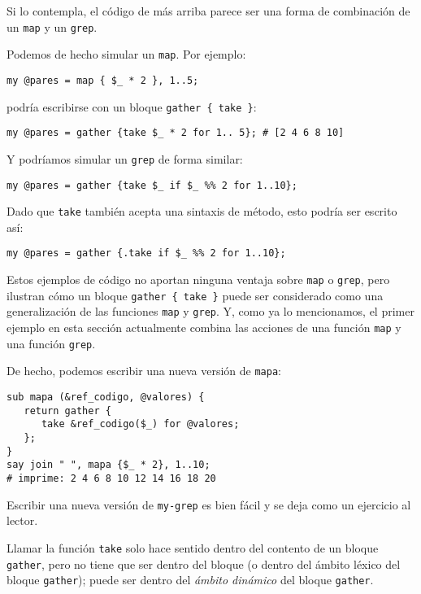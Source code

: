 Si lo contempla, el código de más arriba parece ser una forma de combinación de
un {\tt map} y un {\tt grep}.

Podemos de hecho simular un \verb|map|. Por ejemplo:

\begin{verbatim}
my @pares = map { $_ * 2 }, 1..5;
\end{verbatim}

podría escribirse con un bloque \verb|gather { take }|:

\begin{verbatim}
my @pares = gather {take $_ * 2 for 1.. 5}; # [2 4 6 8 10]
\end{verbatim}

Y podríamos simular un {\tt grep} de forma similar:

\begin{verbatim}
my @pares = gather {take $_ if $_ %% 2 for 1..10};
\end{verbatim}

Dado que {\tt take} también acepta una sintaxis de método, esto podría 
ser escrito así:

\begin{verbatim}
my @pares = gather {.take if $_ %% 2 for 1..10};
\end{verbatim}

Estos ejemplos de código no aportan ninguna ventaja sobre \verb|map| 
o \verb|grep|, pero ilustran cómo un bloque \verb|gather { take }| puede ser
considerado como una generalización de las funciones \verb|map| y \verb|grep|.
Y, como ya lo mencionamos, el primer ejemplo en esta sección actualmente
combina las acciones de una función {\tt map} y una función {\tt grep}.

De hecho, podemos escribir una nueva versión de {\tt mapa}:

\begin{verbatim}
sub mapa (&ref_codigo, @valores) {
   return gather {
      take &ref_codigo($_) for @valores;
   };
}
say join " ", mapa {$_ * 2}, 1..10;
# imprime: 2 4 6 8 10 12 14 16 18 20
\end{verbatim}

Escribir una nueva versión de {\tt my-grep} es bien fácil y
se deja como un ejercicio al lector.

Llamar la función {\tt take} solo hace sentido dentro del
contento de un bloque \verb|gather|, pero no tiene que
ser dentro del bloque (o dentro del ámbito léxico del bloque
\verb|gather|); puede ser dentro del \emph{ámbito dinámico} del
bloque \verb|gather|.

